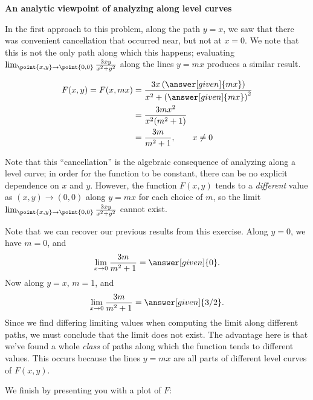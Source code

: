 \documentclass{ximera}
\begin{document}
\textbf{An analytic viewpoint of analyzing along level curves}
\begin{explanation}
In the first approach to this problem, along the path $y=x$, we saw that there was convenient cancellation that occurred near, but not at $x=0$.  We note that this is not the only path along which this happens; evaluating $\lim_{\point{x,y}\to\point{0,0}} \frac{3xy}{x^2+y^2}$ along the lines $y=mx$ produces a similar result.

    \begin{align*}
    F(x,y) = F(x,mx) &= \frac{3x\left(\answer[given]{m x}\right)}{x^2+\left(\answer[given]{mx}\right)^2}  \\
    &= \frac{3mx^2}{x^2(m^2+1)}\\
      &= \frac{3m}{m^2+1}, \qquad x \neq 0\\
    \end{align*}
    
    Note that this ``cancellation'' is the algebraic consequence of analyzing along a level curve; in order for the function to be constant, there can be no explicit dependence on $x$ and $y$.   However, the function $F(x,y)$ tends to a \textit{different} value as $(x,y) \to (0,0)$ along $y=mx$ for each choice of $m$, so the limit $\lim_{\point{x,y}\to\point{0,0}} \frac{3xy}{x^2+y^2}$ cannot exist.
    
 \begin{remark}   
    Note that we can recover our previous results from this exercise.  Along $y=0$, we have $m=0$, and
       \[
    \lim_{x\to 0}\frac{3m}{m^2+1} = \answer[given]{0}.
    \]
    Now along $y=x$, $m=1$, and
    \[
    \lim_{x\to 0}\frac{3m}{m^2+1} = \answer[given]{3/2}.
    \]
    Since we find differing limiting values when computing the limit
    along different paths, we must conclude that the limit does not
    exist.  The advantage here is that we've found a whole \emph{class} of paths along which the function tends to different values.  This occurs because the lines $y=mx$ are all parts of different level curves of $F(x,y)$.
    \end{remark}
        
    \begin{onlineOnly}
      We finish by presenting you with a plot of $F$:
      \begin{center}
      \end{center}
    \end{onlineOnly}
    
  \end{explanation}
\end{document}
